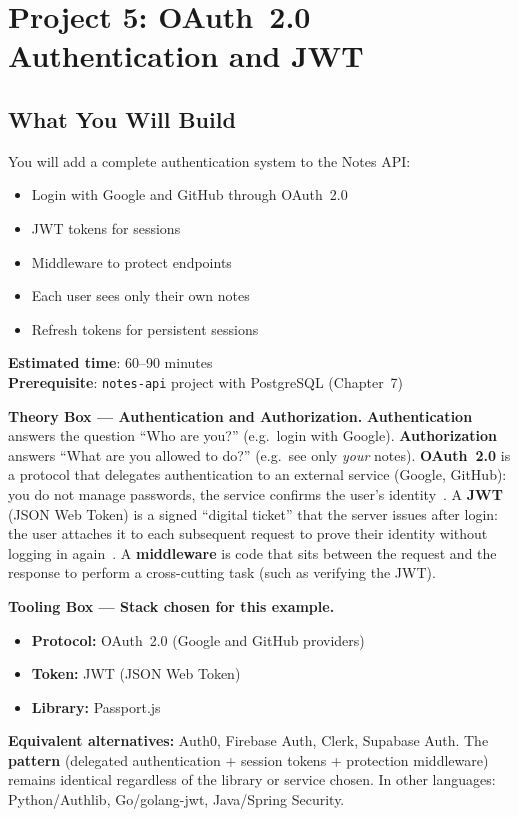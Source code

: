 \chapter{Project 5: OAuth~2.0 Authentication and JWT}

\section*{What You Will Build}
You will add a complete authentication system to the Notes API:
\begin{itemize}
  \item Login with Google and GitHub through OAuth~2.0
  \item JWT tokens for sessions
  \item Middleware to protect endpoints
  \item Each user sees only their own notes
  \item Refresh tokens for persistent sessions
\end{itemize}

\textbf{Estimated time}: 60--90 minutes\\
\textbf{Prerequisite}: \texttt{notes-api} project with PostgreSQL (Chapter~7)

\begin{notebox}
\textbf{Theory Box --- Authentication and Authorization.} \textbf{Authentication} answers the question ``Who are you?'' (e.g.\ login with Google). \textbf{Authorization} answers ``What are you allowed to do?'' (e.g.\ see only \textit{your} notes). \textbf{OAuth~2.0} is a protocol that delegates authentication to an external service (Google, GitHub): you do not manage passwords, the service confirms the user's identity~\cite{rfc6749}. A \textbf{JWT} (JSON Web Token) is a signed ``digital ticket'' that the server issues after login: the user attaches it to each subsequent request to prove their identity without logging in again~\cite{rfc7519}. A \textbf{middleware} is code that sits between the request and the response to perform a cross-cutting task (such as verifying the JWT).
\end{notebox}

\begin{notebox}
\textbf{Tooling Box --- Stack chosen for this example.}
\begin{itemize}
  \item \textbf{Protocol:} OAuth~2.0 (Google and GitHub providers)
  \item \textbf{Token:} JWT (JSON Web Token)
  \item \textbf{Library:} Passport.js
\end{itemize}
\textbf{Equivalent alternatives:} Auth0, Firebase Auth, Clerk, Supabase Auth. The \textbf{pattern} (delegated authentication + session tokens + protection middleware) remains identical regardless of the library or service chosen. In other languages: Python/Authlib, Go/golang-jwt, Java/Spring Security.
\end{notebox}

